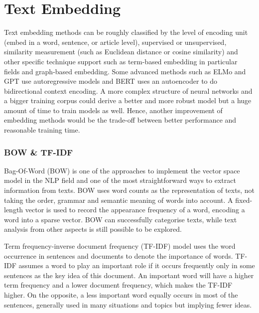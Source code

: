 \section{Text Embedding}
Text embedding methods can be roughly classified by the level of encoding unit (embed in a word, sentence, or article level), supervised or unsupervised, similarity measurement (such as Euclidean distance or cosine similarity) and other specific technique support such as term-based embedding in particular fields and graph-based embedding.
Some advanced methods such as ELMo\cite{peters2018} and GPT\cite{brown2020} use autoregressive models and BERT\cite{niven2019} uses an autoencoder to do bidirectional context encoding.
A more complex structure of neural networks and a bigger training corpus could derive a better and more robust model but a huge amount of time to train models as well.
Hence, another improvement of embedding methods would be the trade-off between better performance and reasonable training time.

\subsubsection{BOW \& TF-IDF}
Bag-Of-Word (BOW) is one of the approaches to implement the vector space model\cite{salton1975} in the NLP field and one of the most straightforward ways to extract information from texts.
BOW uses word counts as the representation of texts, not taking the order, grammar and semantic meaning of words into account.
A fixed-length vector is used to record the appearance frequency of a word, encoding a word into a sparse vector.\cite{sethy2008}
BOW can successfully categorise texts\cite{zhang2010}, while text analysis from other aspects is still possible to be explored.

Term frequency-inverse document frequency (TF-IDF) model uses the word occurrence in sentences and documents to denote the importance of words.
TF-IDF assumes a word to play an important role if it occurs frequently only in some sentences as the key idea of this document.
An important word will have a higher term frequency and a lower document frequency, which makes the TF-IDF higher.
On the opposite, a less important word equally occurs in most of the sentences, generally used in many situations and topics but implying fewer ideas.\cite{li2011}

